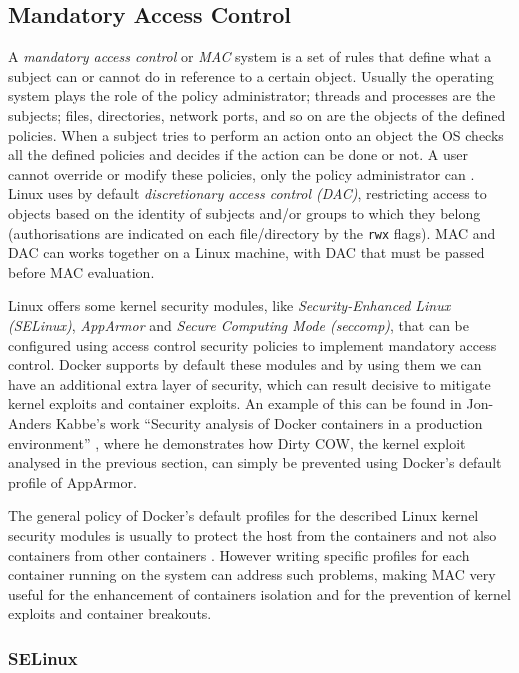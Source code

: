 \documentclass[a4paper,12pt]{article}
\newcommand{\code}[1]{\lstinline|#1|}
\begin{document}
\subsection{Mandatory Access Control}

A \textit{mandatory access control} or \textit{MAC} system is a set of rules that define
what a subject can or cannot do in reference to a certain object. Usually the
operating system plays the role of the policy administrator; threads and
processes are the subjects; files, directories, network ports, and so on are the
objects of the defined policies. When a subject tries to perform an action onto an
object the OS checks all the defined policies and decides if the action can be
done or not. A user cannot override or modify these policies, only the policy
administrator can \cite{wiki_MAC}. Linux uses by default \textit{discretionary access
control (DAC)}, restricting access to objects based on the identity of subjects
and/or groups to which they belong (authorisations are indicated on each
file/directory by the \code{rwx} flags). MAC and DAC can works together on a
Linux machine, with DAC that must be passed before MAC evaluation.\par Linux
offers some kernel security modules, like \textit{Security-Enhanced Linux
(SELinux)}, \textit{AppArmor} and \textit{Secure Computing Mode (seccomp)}, that
can be configured using access control security policies to implement mandatory
access control. Docker supports by default these modules and by using them we
can have an additional extra layer of security, which can result decisive to
mitigate kernel exploits and container exploits. An example of this can be found
in Jon-Anders Kabbe's work ``Security analysis of Docker containers in a
production environment'' \cite{kabbe_security_docker}, where he demonstrates how
Dirty COW, the kernel exploit analysed in the previous section, can simply be
prevented using Docker's default profile of AppArmor. \par  The general policy
of Docker's default profiles for the described Linux kernel security modules is
usually to protect the host from the containers and not also containers from
other containers \cite{to_docker_or_not_to_docker}. However writing specific
profiles for each container running on the system can address such problems,
making MAC very useful for the enhancement of containers isolation and for the
prevention of kernel exploits and container breakouts. 

\subsubsection{SELinux}
\end{document}
